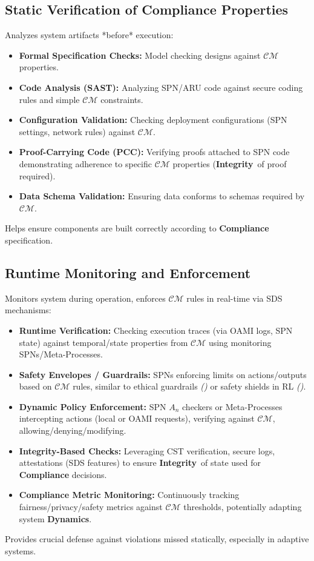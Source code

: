 \documentclass[12pt,a4paper]{report}
\renewcommand{\citep}[1]{\textit{\scriptsize{(\cite{#1})}}}
\newcommand{\Integrity}{\textbf{Integrity}}
\newcommand{\Dynamics}{\textbf{Dynamics}}
\begin{document}
	\subsection{Static Verification of Compliance Properties} %
	\label{sec:5-6-1} %
	
	Analyzes system artifacts *before* execution:
	\begin{itemize}
		\item \textbf{Formal Specification Checks:} Model checking designs against $\mathcal{CM}$ properties.
		\item \textbf{Code Analysis (SAST):} Analyzing SPN/ARU code against secure coding rules and simple $\mathcal{CM}$ constraints.
		\item \textbf{Configuration Validation:} Checking deployment configurations (SPN settings, network rules) against $\mathcal{CM}$.
		\item \textbf{Proof-Carrying Code (PCC):} Verifying proofs attached to SPN code demonstrating adherence to specific $\mathcal{CM}$ properties (\Integrity\ of proof required).
		\item \textbf{Data Schema Validation:} Ensuring data conforms to schemas required by $\mathcal{CM}$.
	\end{itemize}
	Helps ensure components are built correctly according to \textbf{Compliance} specification.
	
	\subsection{Runtime Monitoring and Enforcement} %
	\label{sec:5-6-2} %
	
	Monitors system during operation, enforces $\mathcal{CM}$ rules in real-time via SDS mechanisms:
	\begin{itemize}
		\item \textbf{Runtime Verification:} Checking execution traces (via OAMI logs, SPN state) against temporal/state properties from $\mathcal{CM}$ using monitoring SPNs/Meta-Processes.
		\item \textbf{Safety Envelopes / Guardrails:} SPNs enforcing limits on actions/outputs based on $\mathcal{CM}$ rules, similar to ethical guardrails \citep{Sekrst2024Guardrails} or safety shields in RL \citep{Constraint_RL_Survey_2024}.
		\item \textbf{Dynamic Policy Enforcement:} SPN $A_n$ checkers or Meta-Processes intercepting actions (local or OAMI requests), verifying against $\mathcal{CM}$, allowing/denying/modifying.
		\item \textbf{Integrity-Based Checks:} Leveraging CST verification, secure logs, attestations (SDS features) to ensure \Integrity\ of state used for \textbf{Compliance} decisions.
		\item \textbf{Compliance Metric Monitoring:} Continuously tracking fairness/privacy/safety metrics against $\mathcal{CM}$ thresholds, potentially adapting system \Dynamics.
	\end{itemize}
	Provides crucial defense against violations missed statically, especially in adaptive systems.
	
\end{document}
